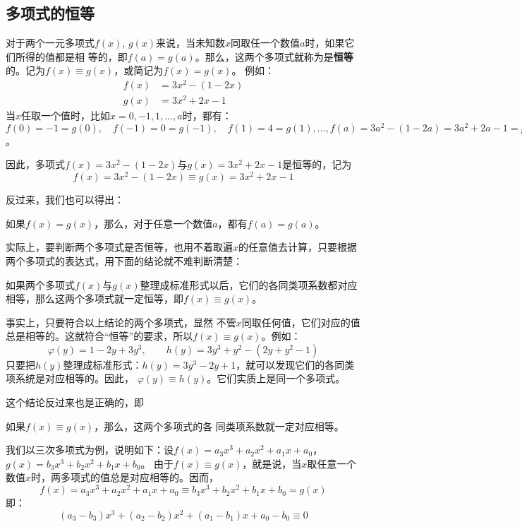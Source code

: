 \subsection{多项式的恒等}

对于两个一元多项式$f(x)$, $g(x)$来说，当未知数$x$同取任一个数值$a$时，如果它们所得的值都是相
等的，即$f(a)=g(a)$。那么，这两个多项式就称为是\textbf{恒等}的。记为$f(x)\equiv g(x)$，或简记为$f(x)=g(x)$。
例如：
\[\begin{split}
    f(x)&=3x^2-(1-2x)\\
g (x) &=3x^2+2x-1
\end{split}\]
当$x$任取一个值时，比如$x=0,-1, 1,\ldots,a$时，都有：$f(0)=-1=g(0),\quad f(-1)=0=g(-1),\quad f(1)=4=g (1), \ldots,f (a) =3a^2- (1-2a) =3a^2+2a-1=g (a)$。

因此，多项式$f(x)=3x^2-(1-2x)$与$g (x) =3x^2+2x-1$是恒等的，记为
\[f(x)=3x^2-(1-2x)\equiv g (x) =3x^2+2x-1 \]

反过来，我们也可以得出：
\begin{blk}{}
    如果$f(x)=g(x)$，那么，对于任意一个数值$a$，都有$f(a)=g(a)$。
\end{blk}

实际上，要判断两个多项式是否恒等，也用不着取遍$x$的任意值去计算，只要根据两个多项式的表达式，用下面的结论就不难判断清楚：

\begin{blk}{}
如果两个多项式$f(x)$与$g(x)$整理成标准形式以后，它们的各同类项系数都对应相等，那么这两个多项式就一定恒等，即$f(x)\equiv g(x)$。
\end{blk}

事实上，只要符合以上结论的两个多项式，显然
不管$x$同取任何值，它们对应的值总是相等的。这就符合“恒等”的要求，所以$f(x)\equiv g(x)$。例如：
\[\varphi(y)=1-2y+3y^3,\qquad h(y)=3y^3+y^2-(2y+y^2-1) \]
只要把$h(y)$整理成标准形式：$h(y)=3y^3-2y+1$，就可以发现它们的各同类项系统是对应相等的。因此，
$\varphi(y)\equiv h(y)$。它们实质上是同一个多项式。

这个结论反过来也是正确的，即

\begin{blk}{}
    如果$f(x)\equiv g(x)$，那么，这两个多项式的各
同类项系数就一定对应相等。
\end{blk}

我们以三次多项式为例，说明如下：设$f(x)=a_3x^3+a_2x^2+a_1x+a_0$，$g(x)=b_3x^3+b_2x^2+b_1x+b_0$。
由于$f(x)\equiv g(x)$，就是说，当$x$取任意一个数值$x$时，两多项式的值总是对应相等的。因而，
\[f(x)=a_3x^3+a_2x^2+a_1x+a_0\equiv b_3x^3+b_2x^2+b_1x+b_0
=g (x) \]
即：\[(a_3-b_3)x^3+(a_2-b_2)x^2+(a_1-b_1)x
+a_0 -b_0\equiv 0\]

